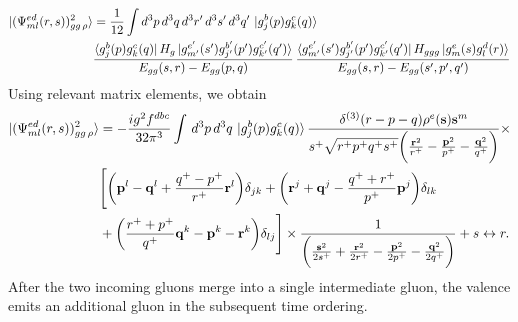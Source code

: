 \documentclass[a4paper,11pt]{article}
\def\v#1{\mathbf{#1}}
\begin{document}
\begin{figure}[htbp]
    \hspace{5cm}
\end{figure}
\begin{align}
    \ket{(\Psi^{ed}_{ml}(r,s))^{2}_{gg\,\rho}} & = \frac{1}{12}\int d^{3}p\, d^{3}q\, d^{3}r^{\prime}\,d^{3}s^{\prime} \,d^{3}q^{\prime}\,\ket{g^{b}_{j}(p)g^{c}_{k}(q)}\notag \\ & \frac{\bra{g^{b}_{j}(p)g^{c}_{k}(q)}H_{g}\ket{g^{e^{\prime}}_{m^{\prime}}(s^{\prime})g^{b^{\prime}}_{j^{\prime}}(p^{\prime})g^{c^{\prime}}_{k^{\prime}}(q^{\prime})}}{E_{gg}(s,r)-E_{gg}(p,q)}\, \frac{\bra{g^{e^{\prime}}_{m^{\prime}}(s^{\prime})g^{b^{\prime}}_{j^{\prime}}(p^{\prime})g^{c^{\prime}}_{k^{\prime}}(q^{\prime})}H_{ggg}\ket{g^{e}_{m}(s)g^{d}_{l}(r)}}{E_{gg}(s,r)-E_{gg}(s^{\prime},p^{\prime},q^{\prime})} 
\end{align}
Using relevant matrix elements, we obtain
\begin{align}
    \ket{(\Psi^{ed}_{ml}(r,s))^{2}_{gg\,\rho}} & = -\frac{ig^{2}f^{dbc}}{32\pi^{3}}\int\, d^{3}p\, d^{3}q\, \ket{g^{b}_{j}(p)g^{c}_{k}(q)} \frac{\delta^{(3)}(r-p-q)\rho^{e}(\v{s})\v{s}^{m}}{s^{+}\sqrt{r^{+}p^{+}q^{+}s^{+}}\bigg(\frac{\v{r}^{2}}{r^{+}}-\frac{\v{p}^{2}}{p^{+}}-\frac{\v{q}^{2}}{q^{+}}\bigg)}\times\notag \\ &   \Bigg[\bigg(\v{p}^{l}-\v{q}^{l} +\frac{q^{+}-p^{+}}{r^{+}}\v{r}^{l}\bigg)\delta_{jk} +\bigg(\v{r}^{j}+\v{q}^{j}-\frac{q^{+}+r^{+}}{p^{+}}\v{p}^{j}\bigg)\delta_{lk}\notag\\ & +\bigg(\frac{r^{+}+p^{+}}{q^{+}}\v{q}^{k}-\v{p}^{k}-\v{r}^{k}\bigg)\delta_{lj}\Bigg] \times \frac{1}{\bigg(\frac{\v{s}^2}{2s^+}+\frac{\v{r}^2}{2r^+}-\frac{\v{p}^2}{2p^+}-\frac{\v{q}^2}{2q^+}\bigg)} + s\leftrightarrow r.
\end{align}
After the two incoming gluons merge into a single intermediate gluon, the valence emits an additional gluon in the subsequent time ordering.
\end{document}
